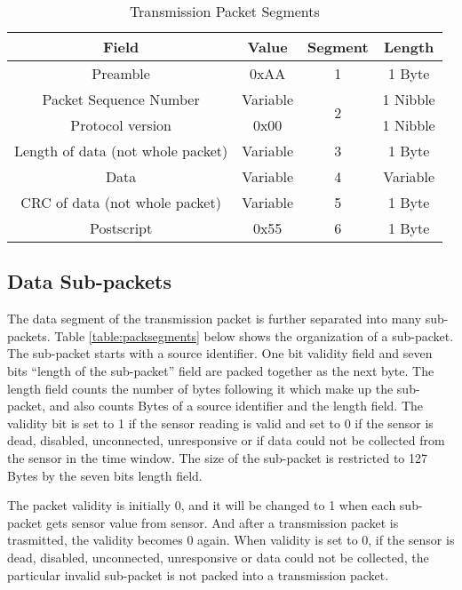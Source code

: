 \begin{table}[H]
    \centering
    {
    \begin{tabular}{|c|c|c|c|}
        \hline
        \rowcolor{black!8}
        \textbf{Field} & \textbf{Value} & \textbf{Segment} & \textbf{Length}\\
        \hline
        Preamble & 0xAA & 1 & 1 Byte\\ \hline
        Packet Sequence Number & Variable & \multirow{2}{*}{2} & 1 Nibble\\ \cline{1-2} \cline{4-4}
        Protocol version & 0x00 &  & 1 Nibble\\ \hline
        Length of data (not whole packet) & Variable & 3 & 1 Byte\\ \hline
        Data & Variable & 4 & Variable \\ \hline
        CRC of data (not whole packet) & Variable & 5 & 1 Byte\\ \hline
        Postscript & 0x55 & 6 & 1 Byte\\ \hline
    \end{tabular}
    }
    \caption{Transmission Packet Segments}
    \label{table:seg}
\end{table}


\subsection{Data Sub-packets} \label{ssec:sub-pack}

The data segment of the transmission packet is further separated into many
sub-packets. Table \ref{table:packsegments} below shows the organization
of a sub-packet.
The sub-packet starts with a source identifier. One bit
validity field and seven bits ``length of the sub-packet'' field
are packed together as the next byte. The length field counts the number of
bytes following it which make up the sub-packet, and also counts Bytes of a source identifier and the length field. 
The validity bit is set to 1 if the sensor reading is valid and set to 0 if the sensor
is dead, disabled, unconnected, unresponsive or if data could not be collected
from the sensor in the time window. The size of the sub-packet is restricted to 127 Bytes by the seven bits length field.
\par
The packet validity is initially 0, and it will be changed to 1 when each sub-packet gets sensor value from sensor. 
And after a transmission packet is trasmitted, the validity becomes 0 again. 
When validity is set to 0, if the sensor is dead, disabled, unconnected, unresponsive or data could not be collected,
the particular invalid sub-packet is not packed into a transmission packet.
\\

